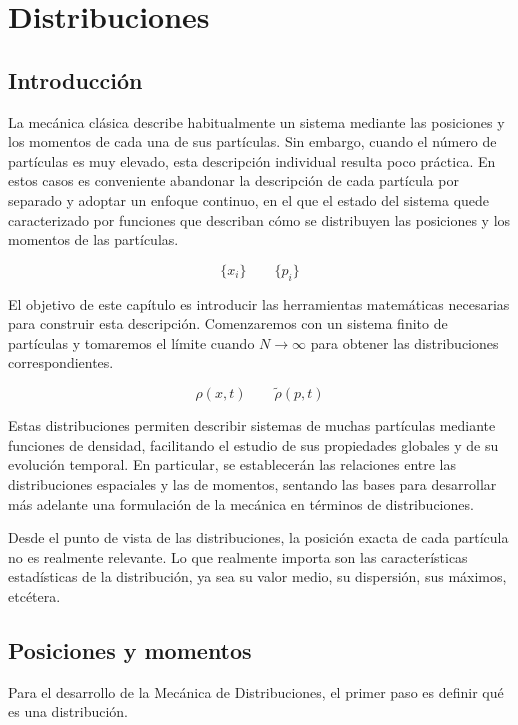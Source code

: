 \chapter{Distribuciones}
\label{cap:distribuciones}


\section{Introducción}

La mecánica clásica describe habitualmente un sistema mediante las posiciones y los momentos de cada una de sus partículas. Sin embargo, cuando el número de partículas es muy elevado, esta descripción individual resulta poco práctica. En estos casos es conveniente abandonar la descripción de cada partícula por separado y adoptar un enfoque continuo, en el que el estado del sistema quede caracterizado por funciones que describan cómo se distribuyen las posiciones y los momentos de las partículas.

\[\{x_i\}\qquad \{p_i\}\]

El objetivo de este capítulo es introducir las herramientas matemáticas necesarias para construir esta descripción. Comenzaremos con un sistema finito de partículas y tomaremos el límite cuando $N\to\infty$ para obtener las distribuciones correspondientes.

\[\rho(x,t)\qquad\tilde\rho(p,t)\]

Estas distribuciones permiten describir sistemas de muchas partículas mediante funciones de densidad, facilitando el estudio de sus propiedades globales y de su evolución temporal. En particular, se establecerán las relaciones entre las distribuciones espaciales y las de momentos, sentando las bases para desarrollar más adelante una formulación de la mecánica en términos de distribuciones.

Desde el punto de vista de las distribuciones, la posición exacta de cada partícula no es realmente relevante. Lo que realmente importa son las características estadísticas de la distribución, ya sea su valor medio, su dispersión, sus máximos, etcétera.



\newpage\section{Posiciones y momentos}

Para el desarrollo de la Mecánica de Distribuciones, el primer paso es definir qué es una distribución. 

